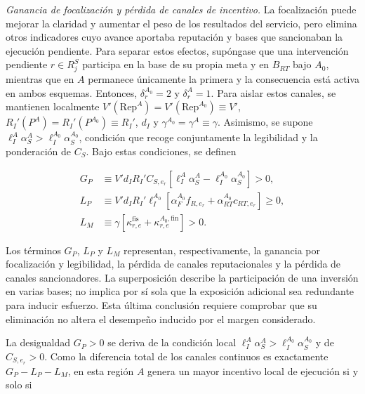 \noindent\textit{Ganancia de focalización y pérdida de canales de incentivo.} La focalización puede mejorar la claridad y aumentar el peso de los resultados del servicio, pero elimina otros indicadores cuyo avance aportaba reputación y bases que sancionaban la ejecución pendiente. Para separar estos efectos, supóngase que una intervención pendiente \(r\in R_j^{S}\) participa en la base de su propia meta y en \(B_{RT}\) bajo \(A_0\), mientras que en \(A\) permanece únicamente la primera y la consecuencia está activa en ambos esquemas. Entonces, \(\delta_r^{A_0}=2\) y \(\delta_r^{A}=1\). Para aislar estos canales, se mantienen localmente \(V'(\mathrm{Rep}^{A})=V'(\mathrm{Rep}^{A_0})\equiv V'\), \(R_I'(P^{A})=R_I'(P^{A_0})\equiv R_I'\), \(d_I\) y \(\gamma^{A_0}=\gamma^{A}\equiv\gamma\). Asimismo, se supone \(\ell_I^{A}\alpha_S^{A}>\ell_I^{A_0}\alpha_S^{A_0}\), condición que recoge conjuntamente la legibilidad y la ponderación de \(C_S\). Bajo estas condiciones, se definen

\begin{subequations}
\label{eq:componentes_benchmark_a0_a}
\begin{align}
G_P &\equiv V'd_I R_I'C_{S,e_r}\left[\ell_I^{A}\alpha_S^{A}-\ell_I^{A_0}\alpha_S^{A_0}\right]>0,
\label{eq:componente_gp_benchmark_a0_a}\\
L_P &\equiv V'd_I R_I'\ell_I^{A_0}\left[\alpha_F^{A_0}f_{R,e_r}+\alpha_{RT}^{A_0}c_{RT,e_r}\right]\geq 0,
\label{eq:componente_lp_benchmark_a0_a}\\
L_M &\equiv \gamma\left[\kappa_{r,e}^{\mathrm{fis}}+\kappa_{r,e}^{A_0,\mathrm{fin}}\right]>0.
\label{eq:componente_lm_benchmark_a0_a}
\end{align}
\end{subequations}

Los términos \(G_P\), \(L_P\) y \(L_M\) representan, respectivamente, la ganancia por focalización y legibilidad, la pérdida de canales reputacionales y la pérdida de canales sancionadores. La superposición describe la participación de una inversión en varias bases; no implica por sí sola que la exposición adicional sea redundante para inducir esfuerzo. Esta última conclusión requiere comprobar que su eliminación no altera el desempeño inducido por el margen considerado.

La desigualdad \(G_P>0\) se deriva de la condición local \(\ell_I^{A}\alpha_S^{A}>\ell_I^{A_0}\alpha_S^{A_0}\) y de \(C_{S,e_r}>0\). Como la diferencia total de los canales continuos es exactamente \(G_P-L_P-L_M\), en esta región \(A\) genera un mayor incentivo local de ejecución si y solo si

